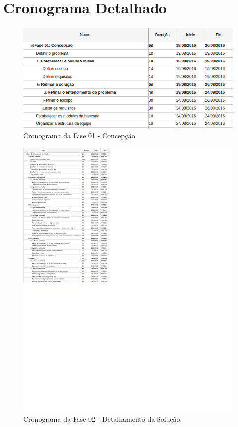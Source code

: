 

\chapter{Cronograma Detalhado}
	\label{cronograma_detalhado}
%     


\begin{figure}[!ht]
\centering
\includegraphics[scale=1]{figuras/cronograma_fase01.png}
\caption{Cronograma da Fase 01 - Concepção}
\end{figure}

\begin{figure}[!ht]
\centering
\includegraphics[scale=0.6]{figuras/cronograma_fase02.png}
\caption{Cronograma da Fase 02 - Detalhamento da Solução}
\end{figure}


